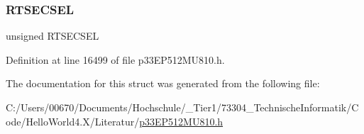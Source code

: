 \subsubsection{\texorpdfstring{R\+T\+S\+E\+C\+S\+EL}{RTSECSEL}}
{\footnotesize\ttfamily unsigned R\+T\+S\+E\+C\+S\+EL}



Definition at line 16499 of file p33\+E\+P512\+M\+U810.\+h.



The documentation for this struct was generated from the following file\+:\begin{DoxyCompactItemize}
\item 
C\+:/\+Users/00670/\+Documents/\+Hochschule/\+\_\+\+Tier1/73304\+\_\+\+Technische\+Informatik/\+Code/\+Hello\+World4.\+X/\+Literatur/\hyperlink{p33_e_p512_m_u810_8h}{p33\+E\+P512\+M\+U810.\+h}\end{DoxyCompactItemize}
